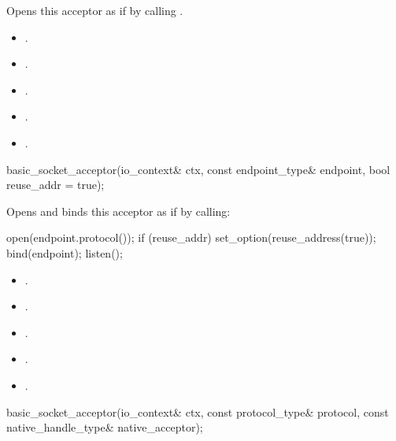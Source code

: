 \begin{itemdescr}
\pnum
\effects Opens this acceptor as if by calling .

\pnum
\postconditions
\begin{itemize}
\item
{}.
\item
{}.
\item
{}.
\item
{}.
\item
{}.
\end{itemize}
\end{itemdescr}

\begin{itemdecl}
basic_socket_acceptor(io_context& ctx, const endpoint_type& endpoint,
                      bool reuse_addr = true);
\end{itemdecl}

\begin{itemdescr}
\pnum
\effects Opens and binds this acceptor as if by calling:
\begin{codeblock}
open(endpoint.protocol());
if (reuse_addr)
  set_option(reuse_address(true));
bind(endpoint);
listen();
\end{codeblock}


\pnum
\postconditions
\begin{itemize}
\item
{}.
\item
{}.
\item
{}.
\item
{}.
\item
{}.
\end{itemize}
\end{itemdescr}

\begin{itemdecl}
basic_socket_acceptor(io_context& ctx, const protocol_type& protocol,
                      const native_handle_type& native_acceptor);
\end{itemdecl}

